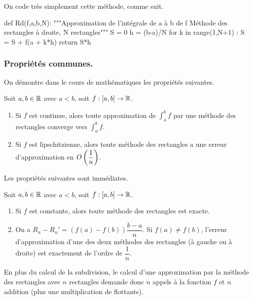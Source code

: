 On code très simplement cette méthode, comme suit. 

\begin{pyverbatim}
def Rd(f,a,b,N):
    """Approximation de l'intégrale de a à b de f 
    Méthode des rectangles à droite, N rectangles"""
    S = 0
    h = (b-a)/N
    for k in range(1,N+1) : 
        S = S + f(a + k*h)
    return S*h
\end{pyverbatim}

\subsubsection{Propriétés communes.}

On démontre dans le cours de mathématiques les propriétés suivantes. 

\begin{prop}
  Soit $a,b \in \mathbb{R}$ avec $a<b$, soit $f : [a,b] \to \mathbb{R}$. 
  \begin{enumerate}
    \item Si $f$ est continue, alors toute approximation de $\displaystyle\int_a^b f$ par une méthode des rectangles converge vers $\displaystyle\int_a^b f$. 
    \item Si $f$ est lipschitzienne, alors toute méthode des rectangles a une erreur d'approximation en $O\left( \dfrac{1}{n}\right)$. 
  \end{enumerate}
\end{prop}

Les propriétés suivantes sont immédiates. 

\begin{prop}
  Soit $a,b \in \mathbb{R}$ avec $a<b$, soit $f : [a,b] \to \mathbb{R}$. 
  \begin{enumerate}
    \item Si $f$ est constante, alors toute méthode des rectangles est exacte. 
    \item On a $R_n - R_n' = (f(a)-f(b))\dfrac{b-a}{n}$. Si $f(a) \neq f(b)$, l'erreur d'approximation d'une des deux méthodes des rectangles (à gauche ou à droite) est exactement de l'ordre de $\dfrac{1}{n}$. 
  \end{enumerate}
\end{prop}

\begin{rem}
  En plus du calcul de la subdivision, le calcul d'une approximation par la méthode des rectangles avec $n$ rectangles demande donc $n$ appels à la fonction $f$ et $n$ addition (plus une multiplication de flottants).
\end{rem}

